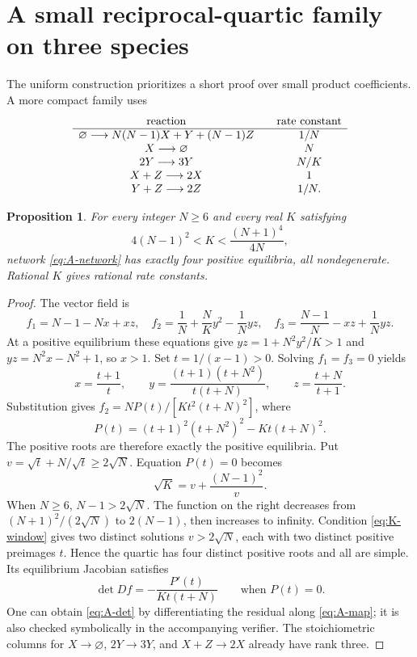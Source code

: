 \documentclass[11pt]{article}
\newtheorem{proposition}{Proposition}
\newcommand{\zero}{\varnothing}
\begin{document}
\section{A small reciprocal-quartic family on three species}
The uniform construction prioritizes a short proof over small product coefficients. A more compact family uses
\begin{equation}\label{eq:A-network}
\begin{array}{c@{\qquad}c}
\text{reaction}&\text{rate constant}\\\hline
\zero\longrightarrow N(N-1)X+Y+(N-1)Z&1/N\\
X\longrightarrow\zero&N\\
2Y\longrightarrow3Y&N/K\\
X+Z\longrightarrow2X&1\\
Y+Z\longrightarrow2Z&1/N.
\end{array}
\end{equation}
\begin{proposition}\label{prop:A}
For every integer $N\geq6$ and every real $K$ satisfying
\begin{equation}\label{eq:K-window}
4(N-1)^2<K<\frac{(N+1)^4}{4N},
\end{equation}
network \eqref{eq:A-network} has exactly four positive equilibria, all nondegenerate. Rational $K$ gives rational rate constants.
\end{proposition}
\begin{proof}
The vector field is
\[
f_1=N-1-Nx+xz,\quad
f_2=\frac1N+\frac{N}{K}y^2-\frac1N yz,\quad
f_3=\frac{N-1}{N}-xz+\frac1N yz.
\]
At a positive equilibrium these equations give $yz=1+N^2y^2/K>1$ and $yz=N^2x-N^2+1$, so $x>1$. Set $t=1/(x-1)>0$. Solving $f_1=f_3=0$ yields
\begin{equation}\label{eq:A-map}
x=\frac{t+1}{t},\qquad y=\frac{(t+1)(t+N^2)}{t(t+N)},\qquad z=\frac{t+N}{t+1}.
\end{equation}
Substitution gives $f_2=NP(t)/[Kt^2(t+N)^2]$, where
\begin{equation}\label{eq:A-poly}
P(t)=(t+1)^2(t+N^2)^2-Kt(t+N)^2.
\end{equation}
The positive roots are therefore exactly the positive equilibria. Put $v=\sqrt t+N/\sqrt t\geq2\sqrt N$. Equation $P(t)=0$ becomes
\[
\sqrt K=v+\frac{(N-1)^2}{v}.
\]
When $N\geq6$, $N-1>2\sqrt N$. The function on the right decreases from $(N+1)^2/(2\sqrt N)$ to $2(N-1)$, then increases to infinity. Condition \eqref{eq:K-window} gives two distinct solutions $v>2\sqrt N$, each with two distinct positive preimages $t$. Hence the quartic has four distinct positive roots and all are simple. Its equilibrium Jacobian satisfies
\begin{equation}\label{eq:A-det}
\det Df=-\frac{P'(t)}{Kt(t+N)}\qquad\text{when }P(t)=0.
\end{equation}
One can obtain \eqref{eq:A-det} by differentiating the residual along \eqref{eq:A-map}; it is also checked symbolically in the accompanying verifier. The stoichiometric columns for $X\to\zero$, $2Y\to3Y$, and $X+Z\to2X$ already have rank three.
\end{proof}
\end{document}
